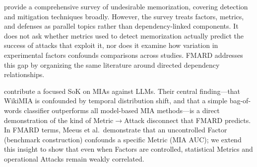 \documentclass[11pt]{article}
\begin{document}
\textbf{\citet{satvaty2024undesirable}} provide a comprehensive survey of
undesirable memorization, covering detection and mitigation techniques broadly.
However, the survey treats factors, metrics, and defenses as parallel topics
rather than dependency-linked components.
It does not ask whether metrics used to detect memorization actually predict
the success of attacks that exploit it, nor does it examine how variation in
experimental factors confounds comparisons across studies.
FMARD addresses this gap by organizing the same literature around directed
dependency relationships.

\textbf{\citet{meeus2025sok}} contribute a focused SoK on MIAs against LLMs.
Their central finding---that WikiMIA is confounded by temporal distribution
shift, and that a simple bag-of-words classifier outperforms all model-based
MIA methods---is a direct demonstration of the kind of Metric$\to$Attack
disconnect that FMARD predicts.
In FMARD terms, Meeus et al.\ demonstrate that an uncontrolled Factor
(benchmark construction) confounds a specific Metric (MIA AUC); we extend this
insight to show that even when Factors are controlled, statistical Metrics and
operational Attacks remain weakly correlated.

\end{document}
